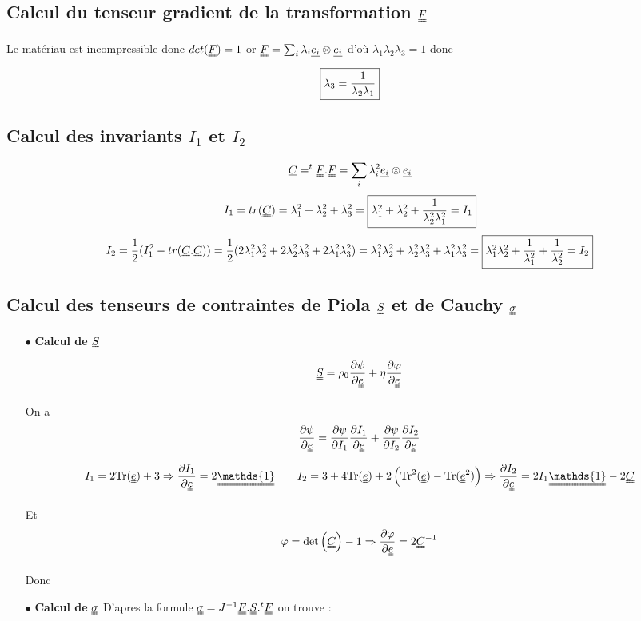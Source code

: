 \documentclass[a4paper,11pt]{article}
\begin{document}
\subsection{Calcul du tenseur gradient de la transformation $\uuline{F}$}
Le matériau est incompressible donc $det(\uuline{F})=1$ or $\uuline{F}=\sum_{i} \lambda_i \uline{e_i}\otimes \uline{e_i}$ d'où $\lambda_1\lambda_2\lambda_3=1$ donc $$\fbox{$\lambda_3=\dfrac{1}{\lambda_2\lambda_1} $}$$

\subsection{Calcul des invariants $I_1$ et $I_2$}
$$\uline{C}=^t\uuline{F}.\uuline{F}=\sum_{i} \lambda_i ^2\uline{e_i}\otimes \uline{e_i}$$
$$I_1= tr(\uuline{C})=\lambda_1^2+\lambda_2^2+\lambda_3^2=\fbox{$\lambda_1^2+\lambda_2^2+\dfrac{1}{\lambda_2^2\lambda_1^2}=I_1$}$$
$$I_2=\frac{1}{2}(I_1^2 - tr(\uuline{C}.\uuline{C})) =\frac{1}{2}(2\lambda_1^2\lambda_2^2+2\lambda_2^2\lambda_3^2+2\lambda_1^2\lambda_3^2) =\lambda_1^2\lambda_2^2+\lambda_2^2\lambda_3^2+\lambda_1^2\lambda_3^2 =\fbox{$\lambda_1^2\lambda_2^2+\dfrac{1}{\lambda_1^2}+\dfrac{1}{\lambda_2^2}=I_2$}$$

\subsection{Calcul des tenseurs de contraintes de Piola $\uuline{S}$ et de Cauchy $\uuline{\sigma}$}
\begin{itemize}
	\item[$\bullet$ \textbf{Calcul de} $\uuline{S}$] $$ \uuline{S} = \rho_0 \frac{\partial \psi}{\partial \uuline{e}} + \eta\frac{\partial \varphi}{\partial \uuline{e}} $$
	
	On a $$\frac{\partial \psi}{\partial \uuline{e}}= \frac{\partial \psi}{\partial I_1}\frac{\partial I_1}{\partial \uuline{e}}+\frac{\partial \psi}{\partial I_2}\frac{\partial I_2}{\partial \uuline{e}}$$
 $$I_1=2\text{Tr}(\uuline{e})+3\Rightarrow \frac{\partial I_1}{\partial \uuline{e}}= 2\uuline{\mathds{1}} \quad \quad I_2=3+4\text{Tr}(\uuline{e})+2\left(\text{Tr}^2(\uuline{e})-\text{Tr}(\uuline{e}^2)\right)
 \Rightarrow \frac{\partial I_2}{\partial \uuline{e}}= 2 I_1\uuline{\mathds{1}}-2\uuline{C}   $$

Et $$\varphi=\text{det}\left(\uuline{C}\right)-1 \Rightarrow  \frac{\partial \varphi}{\partial \uuline{e}}= 2\uuline{C}^{-1}$$

Donc 
	\item[$\bullet$ \textbf{Calcul de} $\uuline{\sigma}$] D'apres la formule $\uuline{\sigma}=J^{-1}\uuline{F}.\uuline{S}.{}^t\uuline{F} $ on trouve :
	\\
\end{itemize}
\end{document}
